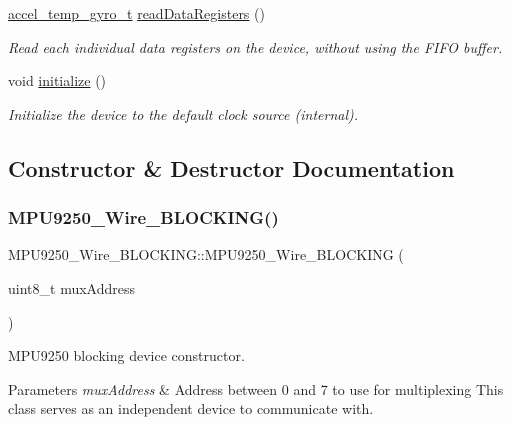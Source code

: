 \begin{DoxyCompactItemize}
\hyperlink{unionaccel__temp__gyro__t}{accel\+\_\+temp\+\_\+gyro\+\_\+t} \hyperlink{class_m_p_u9250___wire___b_l_o_c_k_i_n_g_a79432cf3440f57dd8fb16d52bc7cf4dd}{read\+Data\+Registers} ()
\begin{DoxyCompactList}\small\item\em Read each individual data registers on the device, without using the F\+I\+FO buffer. \end{DoxyCompactList}\item 
void \hyperlink{class_m_p_u9250___wire___b_l_o_c_k_i_n_g_aa62baa380f82620f245015c2c19c8f30}{initialize} ()
\begin{DoxyCompactList}\small\item\em Initialize the device to the default clock source (internal). \end{DoxyCompactList}\end{DoxyCompactItemize}


\subsection{Constructor \& Destructor Documentation}
\mbox{\label{class_m_p_u9250___wire___b_l_o_c_k_i_n_g_a998ae4c4645f79925e49d5a68511bfd5}} 
\subsubsection{\texorpdfstring{M\+P\+U9250\+\_\+\+Wire\+\_\+\+B\+L\+O\+C\+K\+I\+N\+G()}{MPU9250\_Wire\_BLOCKING()}}
{\footnotesize\ttfamily M\+P\+U9250\+\_\+\+Wire\+\_\+\+B\+L\+O\+C\+K\+I\+N\+G\+::\+M\+P\+U9250\+\_\+\+Wire\+\_\+\+B\+L\+O\+C\+K\+I\+NG (\begin{DoxyParamCaption}\item[{uint8\+\_\+t}]{mux\+Address }\end{DoxyParamCaption})}



M\+P\+U9250 blocking device constructor. 


\begin{DoxyParams}{Parameters}
{\em mux\+Address} & Address between 0 and 7 to use for multiplexing This class serves as an independent device to communicate with. \\
\hline
\end{DoxyParams}



